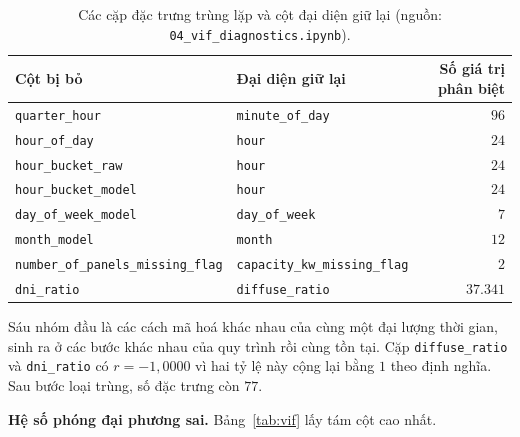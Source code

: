 \begin{table}[htbp]
\centering
\caption{Các cặp đặc trưng trùng lặp và cột đại diện giữ lại (nguồn: \texttt{04\_vif\_diagnostics.ipynb}).}
\label{tab:trung_lap}
\footnotesize
\begin{tabular}{l l r}
\toprule
\textbf{Cột bị bỏ} & \textbf{Đại diện giữ lại} & \textbf{Số giá trị phân biệt} \\
\midrule
\texttt{quarter\_hour}                  & \texttt{minute\_of\_day}            & $96$ \\
\texttt{hour\_of\_day}                  & \texttt{hour}                       & $24$ \\
\texttt{hour\_bucket\_raw}              & \texttt{hour}                       & $24$ \\
\texttt{hour\_bucket\_model}            & \texttt{hour}                       & $24$ \\
\texttt{day\_of\_week\_model}           & \texttt{day\_of\_week}              & $7$ \\
\texttt{month\_model}                   & \texttt{month}                      & $12$ \\
\texttt{number\_of\_panels\_missing\_flag} & \texttt{capacity\_kw\_missing\_flag} & $2$ \\
\texttt{dni\_ratio}                     & \texttt{diffuse\_ratio}             & $37.341$ \\
\bottomrule
\end{tabular}
\end{table}

Sáu nhóm đầu là các cách mã hoá khác nhau của cùng một đại lượng thời gian, sinh ra ở các bước
khác nhau của quy trình rồi cùng tồn tại. Cặp \texttt{diffuse\_ratio} và \texttt{dni\_ratio} có
$r = -1{,}0000$ vì hai tỷ lệ này cộng lại bằng $1$ theo định nghĩa. Sau bước loại trùng, số đặc
trưng còn $77$.

\textbf{Hệ số phóng đại phương sai.} Bảng~\ref{tab:vif} lấy tám cột cao nhất.

